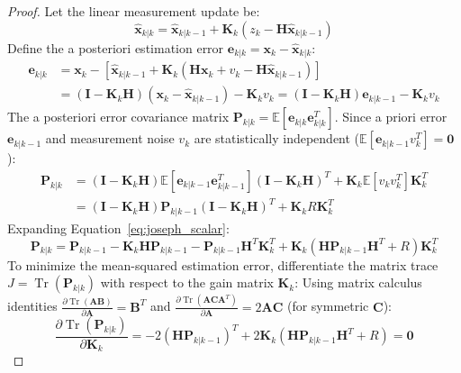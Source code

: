 \documentclass[11pt, a4paper]{article}
\begin{document}
\begin{proof}
Let the linear measurement update be:
\begin{equation}
    \hat{\mathbf{x}}_{k|k} = \hat{\mathbf{x}}_{k|k-1} + \mathbf{K}_k (z_k - \mathbf{H}\hat{\mathbf{x}}_{k|k-1})
\end{equation}
Define the a posteriori estimation error $\mathbf{e}_{k|k} = \mathbf{x}_k - \hat{\mathbf{x}}_{k|k}$:
\begin{align}
    \mathbf{e}_{k|k} &= \mathbf{x}_k - \left[ \hat{\mathbf{x}}_{k|k-1} + \mathbf{K}_k (\mathbf{H} \mathbf{x}_k + v_k - \mathbf{H}\hat{\mathbf{x}}_{k|k-1}) \right] \\
    &= (\mathbf{I} - \mathbf{K}_k \mathbf{H})(\mathbf{x}_k - \hat{\mathbf{x}}_{k|k-1}) - \mathbf{K}_k v_k = (\mathbf{I} - \mathbf{K}_k \mathbf{H})\mathbf{e}_{k|k-1} - \mathbf{K}_k v_k
\end{align}
The a posteriori error covariance matrix $\mathbf{P}_{k|k} = \mathbb{E}[\mathbf{e}_{k|k} \mathbf{e}_{k|k}^T]$. Since a priori error $\mathbf{e}_{k|k-1}$ and measurement noise $v_k$ are statistically independent ($\mathbb{E}[\mathbf{e}_{k|k-1} v_k^T] = \mathbf{0}$):
\begin{align}
    \mathbf{P}_{k|k} &= (\mathbf{I} - \mathbf{K}_k \mathbf{H}) \mathbb{E}[\mathbf{e}_{k|k-1} \mathbf{e}_{k|k-1}^T] (\mathbf{I} - \mathbf{K}_k \mathbf{H})^T + \mathbf{K}_k \mathbb{E}[v_k v_k^T] \mathbf{K}_k^T \\
    &= (\mathbf{I} - \mathbf{K}_k \mathbf{H}) \mathbf{P}_{k|k-1} (\mathbf{I} - \mathbf{K}_k \mathbf{H})^T + \mathbf{K}_k R \mathbf{K}_k^T \label{eq:joseph_scalar}
\end{align}
Expanding Equation~\ref{eq:joseph_scalar}:
\begin{equation}
    \mathbf{P}_{k|k} = \mathbf{P}_{k|k-1} - \mathbf{K}_k \mathbf{H} \mathbf{P}_{k|k-1} - \mathbf{P}_{k|k-1} \mathbf{H}^T \mathbf{K}_k^T + \mathbf{K}_k (\mathbf{H} \mathbf{P}_{k|k-1} \mathbf{H}^T + R) \mathbf{K}_k^T
\end{equation}
To minimize the mean-squared estimation error, differentiate the matrix trace $J = \operatorname{Tr}(\mathbf{P}_{k|k})$ with respect to the gain matrix $\mathbf{K}_k$:
Using matrix calculus identities $\frac{\partial \operatorname{Tr}(\mathbf{A}\mathbf{B})}{\partial \mathbf{A}} = \mathbf{B}^T$ and $\frac{\partial \operatorname{Tr}(\mathbf{A}\mathbf{C}\mathbf{A}^T)}{\partial \mathbf{A}} = 2\mathbf{A}\mathbf{C}$ (for symmetric $\mathbf{C}$):
\begin{equation}
    \frac{\partial \operatorname{Tr}(\mathbf{P}_{k|k})}{\partial \mathbf{K}_k} = -2 (\mathbf{H}\mathbf{P}_{k|k-1})^T + 2 \mathbf{K}_k (\mathbf{H}\mathbf{P}_{k|k-1}\mathbf{H}^T + R) = \mathbf{0}

\end{equation}
\end{proof}
\end{document}
